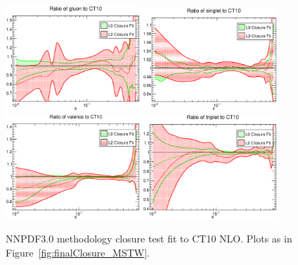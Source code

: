 \begin{figure}[!]
\centering
\includegraphics[width=0.45\textwidth]{7-PostLHC/figs/finalClosure/CT10/gluon.eps}
\includegraphics[width=0.45\textwidth]{7-PostLHC/figs/finalClosure/CT10/singlet.eps}
\includegraphics[width=0.45\textwidth]{7-PostLHC/figs/finalClosure/CT10/valence.eps}
\includegraphics[width=0.45\textwidth]{7-PostLHC/figs/finalClosure/CT10/triplet.eps}
\caption[NNPDF3.0 methodology closure test fit to CT10 NLO]{NNPDF3.0 methodology closure test fit to CT10 NLO. Plots as in Figure~\ref{fig:finalClosure_MSTW}. }
\label{fig:finalClosure_CT10}
\end{figure}

